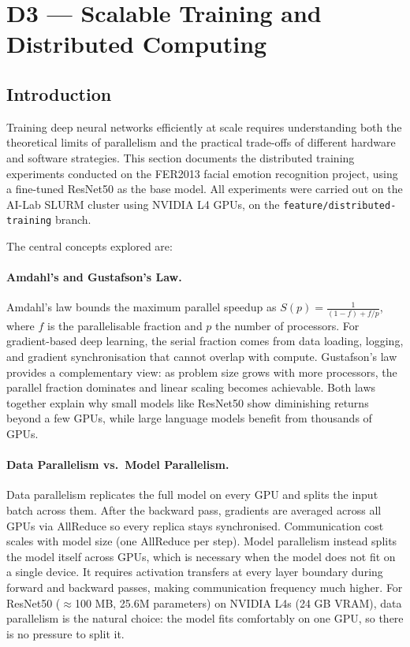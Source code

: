 
\section{D3 — Scalable Training and Distributed Computing}

\subsection{Introduction}

Training deep neural networks efficiently at scale requires understanding both the
theoretical limits of parallelism and the practical trade-offs of different hardware
and software strategies. This section documents the distributed training experiments
conducted on the FER2013 facial emotion recognition project, using a fine-tuned
ResNet50 as the base model. All experiments were carried out on the AI-Lab SLURM
cluster using NVIDIA L4 GPUs, on the \texttt{feature/distributed-training} branch.

The central concepts explored are:

\paragraph{Amdahl's and Gustafson's Law.}
Amdahl's law bounds the maximum parallel speedup as
$S(p) = \frac{1}{(1-f) + f/p}$,
where $f$ is the parallelisable fraction and $p$ the number of processors.
For gradient-based deep learning, the serial fraction comes from data loading,
logging, and gradient synchronisation that cannot overlap with compute.
Gustafson's law provides a complementary view: as problem size grows with
more processors, the parallel fraction dominates and linear scaling becomes
achievable. Both laws together explain why small models like ResNet50 show
diminishing returns beyond a few GPUs, while large language models benefit
from thousands of GPUs.

\paragraph{Data Parallelism vs.\ Model Parallelism.}
Data parallelism replicates the full model on every GPU and splits the
input batch across them. After the backward pass, gradients are averaged
across all GPUs via AllReduce so every replica stays synchronised.
Communication cost scales with model size (one AllReduce per step).
Model parallelism instead splits the model itself across GPUs, which is
necessary when the model does not fit on a single device. It requires
activation transfers at every layer boundary during forward and backward
passes, making communication frequency much higher.
For ResNet50 ($\approx$100 MB, 25.6M parameters) on NVIDIA L4s (24 GB VRAM),
data parallelism is the natural choice: the model fits comfortably on one
GPU, so there is no pressure to split it.


